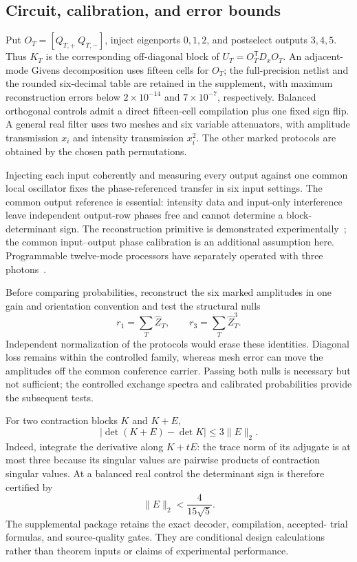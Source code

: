 \documentclass[11pt]{article}
\theoremstyle{remark}
\begin{document}
\subsection*{Circuit, calibration, and error bounds}

Put \(O_T=[Q_{T,+}\ Q_{T,-}]\), inject eigenports \(0,1,2\), and postselect
outputs \(3,4,5\).  Thus \(K_T\) is the corresponding off-diagonal block of
\(U_T=O_T^{\mathsf T}D_xO_T\).  An adjacent-mode Givens decomposition
uses fifteen cells for \(O_T\); the full-precision netlist and the rounded
six-decimal table are retained in the supplement, with maximum reconstruction
errors below \(2\times10^{-14}\) and \(7\times10^{-7}\), respectively.
Balanced orthogonal controls admit a direct fifteen-cell compilation plus one
fixed sign flip.  A general real filter uses two meshes and six variable
attenuators, with amplitude transmission \(x_i\) and intensity transmission
\(x_i^2\).  The other marked protocols are obtained by the chosen path
permutations.

Injecting each input coherently and measuring every output against one common
local oscillator fixes the phase-referenced transfer in six input settings.
The common output reference is essential: intensity data and input-only
interference leave independent output-row phases free and cannot determine a
block-determinant sign.  The reconstruction primitive is demonstrated
experimentally~\cite{RahimiKeshari}; the common input--output phase calibration
is an additional assumption here.  Programmable twelve-mode processors have
separately operated with three photons~\cite{Somhorst}.

Before comparing probabilities, reconstruct the six marked amplitudes in one
gain and orientation convention and test the structural nulls
\[
 r_1=\sum_T\widehat Z_T,\qquad r_3=\sum_T\widehat Z_T^3.
\]
Independent normalization of the protocols would erase these identities.
Diagonal loss remains within the controlled family, whereas mesh error can
move the amplitudes off the common conference carrier.  Passing both nulls is
necessary but not sufficient; the controlled exchange spectra and calibrated
probabilities provide the subsequent tests.

For two contraction blocks \(K\) and \(K+E\),
\begin{equation}
\label{eq:determinant-stability}
 |\det(K+E)-\det K|\leq3\lVert E\rVert_2.
\end{equation}
Indeed, integrate the derivative along \(K+tE\): the trace norm of its
adjugate is at most three because its singular values are pairwise products of
contraction singular values.
\newpage
At a balanced real control the determinant sign
is therefore certified by
\[
 \lVert E\rVert_2<\frac{4}{15\sqrt5}.
\]
The supplemental package retains the exact decoder, compilation, accepted-
trial formulas, and source-quality gates.  They are conditional design
calculations rather than theorem inputs or claims of experimental performance.
\end{document}

